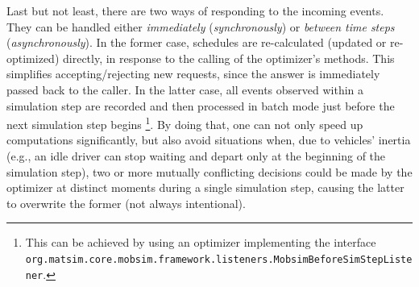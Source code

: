 Last but not least, there are two ways of responding to the incoming events. They can be handled either \emph{immediately} (\emph{synchronously}) or \emph{between time steps} (\emph{asynchronously}). In the former case, schedules are re-calculated (updated or re-optimized) directly, in response to the calling of the optimizer's methods. This simplifies accepting/rejecting new requests, since the answer is immediately passed back to the caller. In the latter case, all events observed within a simulation step are recorded and then processed in batch mode just before the next simulation step begins%
\footnote{
This can be achieved by using an optimizer implementing the interface \lstinline$org.matsim.core.mobsim.framework.listeners.MobsimBeforeSimStepListener$. 
}.
By doing that, one can not only speed up computations significantly, but also avoid situations when, due to vehicles' inertia (e.g., an idle driver can stop waiting and depart only at the beginning of the simulation step),
two or more mutually conflicting decisions could be made by the optimizer at distinct moments during a single simulation step, causing the latter to overwrite the former (not always intentional).

